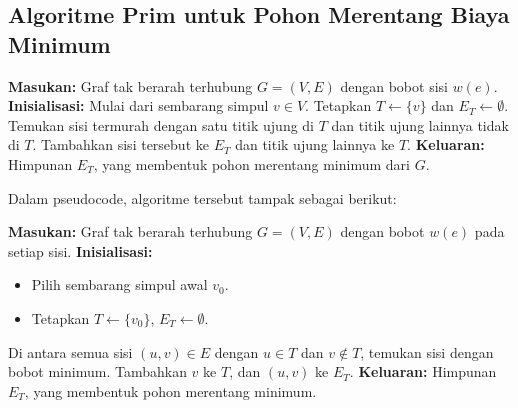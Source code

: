 \begin{enumerate}[label={}, leftmargin=3.5em, labelwidth=3em, align=left]
\begin{minipage}{0.55\linewidth}
\end{minipage}
\end{enumerate}

\subsection{Algoritme Prim untuk Pohon Merentang Biaya Minimum}

\begin{algorithm}[H]
\caption{Algoritme Prim (Versi Deskriptif)}
\begin{algorithmic}[1]
\State \textbf{Masukan:} Graf tak berarah terhubung \( G = (V, E) \) dengan bobot sisi \( w(e) \).
\State \textbf{Inisialisasi:} Mulai dari sembarang simpul \( v \in V \). Tetapkan \( T \gets \{v\} \) dan \( E_T \gets \emptyset \).
\Repeat
  \State Temukan sisi termurah dengan satu titik ujung di \( T \) dan titik ujung lainnya tidak di \( T \).
  \State Tambahkan sisi tersebut ke \( E_T \) dan titik ujung lainnya ke \( T \).
\State \textbf{Keluaran:} Himpunan \( E_T \), yang membentuk pohon merentang minimum dari \( G \).
\end{algorithmic}
\end{algorithm}

Dalam pseudocode, algoritme tersebut tampak sebagai berikut:

\begin{algorithm}[H]
\caption{Algoritme Prim}
\begin{algorithmic}[1]
\State \textbf{Masukan:} Graf tak berarah terhubung \( G = (V, E) \) dengan bobot \( w(e) \) pada setiap sisi.
\State \textbf{Inisialisasi:}
  \begin{itemize}
    \item Pilih sembarang simpul awal \( v_0 \).
    \item Tetapkan \( T \gets \{v_0\} \), \( E_T \gets \emptyset \).
  \end{itemize}
  \State Di antara semua sisi \( (u, v) \in E \) dengan \( u \in T \) dan \( v \notin T \), temukan sisi dengan bobot minimum.
  \State Tambahkan \( v \) ke \( T \), dan \( (u,v) \) ke \( E_T \).
\EndWhile
\State \textbf{Keluaran:} Himpunan \( E_T \), yang membentuk pohon merentang minimum.
\end{algorithmic}
\end{algorithm}

